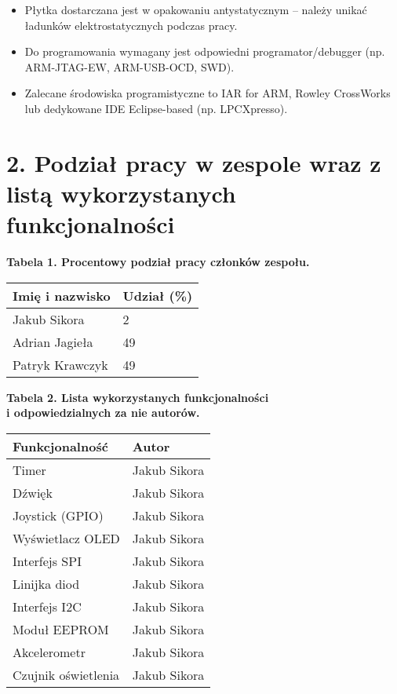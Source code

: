 \documentclass[a4paper,12pt]{report}
\begin{document}
\begin{itemize}
    \item Płytka dostarczana jest w opakowaniu antystatycznym – należy unikać ładunków elektrostatycznych podczas pracy.
    \item Do programowania wymagany jest odpowiedni programator/debugger (np. ARM-JTAG-EW, ARM-USB-OCD, SWD).
    \item Zalecane środowiska programistyczne to IAR for ARM, Rowley CrossWorks lub dedykowane IDE Eclipse-based (np. LPCXpresso).
\end{itemize}
\clearpage

\section*{2. Podział pracy w zespole wraz z listą wykorzystanych funkcjonalności}
\begin{table}[h]
    \centering
    \textbf{Tabela 1. Procentowy podział pracy członków zespołu.\\}
    \vspace{1em}
    \begin{tabular}{|l|l|}
        \hline
        Imię i nazwisko     & Udział (\%) \\
        \hline
        Jakub Sikora        & 2          \\
        Adrian Jagieła      & 49         \\
        Patryk Krawczyk     & 49         \\
        \hline
    \end{tabular}

    \vspace{2em}
    \textbf{Tabela 2. Lista wykorzystanych funkcjonalności \\ i odpowiedzialnych za nie autorów. \\}
    \vspace{1em}
    \begin{tabular}{|l|l|}
        \hline
        Funkcjonalność      & Autor        \\
        \hline
        Timer               & Jakub Sikora \\
        Dźwięk              & Jakub Sikora \\
        Joystick (GPIO)     & Jakub Sikora \\
        Wyświetlacz OLED    & Jakub Sikora \\
        Interfejs SPI       & Jakub Sikora \\
        Linijka diod        & Jakub Sikora \\
        Interfejs I2C       & Jakub Sikora \\
        Moduł EEPROM        & Jakub Sikora \\
        Akcelerometr        & Jakub Sikora \\
        Czujnik oświetlenia & Jakub Sikora \\
        \hline
    \end{tabular}
\end{table}
\end{document}
